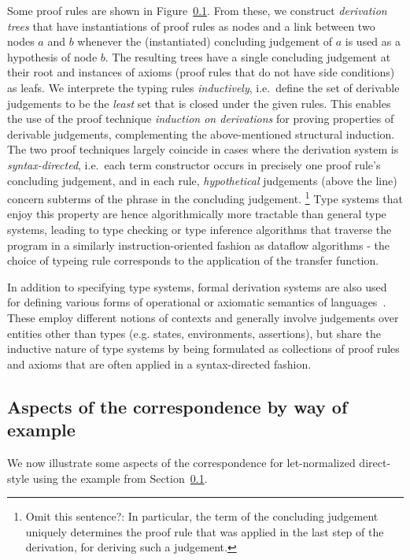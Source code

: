 Some proof rules are shown in Figure~\ref{}. From these, we construct
\emph{derivation trees} that have instantiations of proof rules as
nodes and a link between two nodes $a$ and $b$ whenever the
(instantiated) concluding judgement of $a$ is used as a hypothesis of
node $b$. The resulting trees have a single concluding
judgement at their root and instances of axioms (proof rules that do
not have side conditions) as leafs. We interprete the typing rules
\emph{inductively}, i.e.~define the set of derivable judgements to be
the \emph{least} set that is closed under the given rules. This
enables the use of the proof technique
\emph{induction on derivations} for proving properties of derivable judgements, complementing the above-mentioned structural induction.
The two proof techniques largely coincide in cases where the derivation
system is \emph{syntax-directed}, i.e.~each term constructor occurs in
precisely one proof rule's concluding judgement, and in each rule,
\emph{hypothetical} judgements (above the line) concern subterms of the phrase in the concluding judgement. \footnote{Omit this sentence?: In particular, the term of the concluding judgement uniquely determines the proof rule that was applied in the last step of the derivation, for deriving such a judgement. }
Type systems that enjoy this property are hence algorithmically more
tractable than general type systems, leading to type checking or type
inference algorithms that traverse the program in a similarly
instruction-oriented fashion as dataflow algorithms - the choice of
typeing rule corresponds to the application of the transfer function.

In addition to specifying type systems, formal derivation systems are
also used for defining various forms of operational or axiomatic
semantics of languages~\cite{Hoare69,Plotkin1981}. These employ different notions of contexts and
generally involve judgements over entities other than types
(e.g. states, environments, assertions), but share the inductive
nature of type systems by being formulated as collections of proof
rules and axioms that are often applied in a syntax-directed fashion.

\subsection{Aspects of the correspondence by way of example}

We now illustrate some aspects of the correspondence for
let-normalized direct-style using the example from Section~\ref{}.

